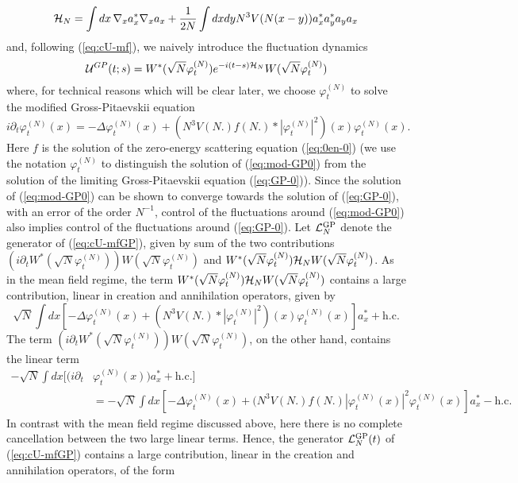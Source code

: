 \documentclass[11pt,a4paper]{article}
\newcommand{\cU}{{\cal U}}
\newcommand{\cH}{{\cal H}}
\newcommand{\cL}{{\cal L}}
\begin{document}
\begin{equation}\label{eq:cHN} \cH_N = \int dx \, \nabla_x a_x^* \nabla_x a_x + \frac{1}{2N} \int dx dy N^3 V(N (x-y)) a_x^* a_y^* a_y a_x \end{equation}
and, following (\ref{eq:cU-mf}), we naively introduce the fluctuation dynamics
\begin{equation}\label{eq:cU-mfGP} 
\cU^{GP} (t;s) = W^* (\sqrt{N} \varphi^{(N)}_t) e^{-i (t-s) \cH_N} W(\sqrt{N} \varphi^{(N)}_t) \end{equation}
where, for technical reasons which will be clear later, we choose $\varphi^{(N)}_t$ to solve the modified Gross-Pitaevskii equation 
\begin{equation}\label{eq:mod-GP0} i\partial_t \varphi^{(N)}_t (x) = -\Delta
\varphi^{(N)}_t (x) + (N^3 V(N.) f(N.) * |\varphi^{(N)}_t|^2) (x)
\varphi^{(N)}_t (x). \end{equation}
Here $f$ is the solution of the zero-energy scattering equation (\ref{eq:0en-0}) (we use the notation $\varphi_t^{(N)}$ to distinguish the solution of (\ref{eq:mod-GP0}) from the solution of the limiting Gross-Pitaevskii equation (\ref{eq:GP-0})). Since the solution of (\ref{eq:mod-GP0}) can be shown to converge towards the solution of (\ref{eq:GP-0}), with an error of the order $N^{-1}$, control of the fluctuations around (\ref{eq:mod-GP0}) also implies control of the fluctuations around (\ref{eq:GP-0}). Let $\cL_N^{\text{GP}}$ denote the generator of (\ref{eq:cU-mfGP}), given by sum of the two contributions $(i\partial_t W^* (\sqrt{N} \varphi^{(N)}_t)) W (\sqrt{N} \varphi^{(N)}_t)$ and $W^* (\sqrt{N} \varphi^{(N)}_t) \cH_N W (\sqrt{N} \varphi^{(N)}_t)$. As in the mean field regime, the term $W^*(\sqrt{N} \varphi^{(N)}_t) \cH_N W(\sqrt{N} \varphi^{(N)}_t)$ contains a large contribution, linear in creation and annihilation operators, given by
\[ \sqrt{N} \int dx \left[ -\Delta \varphi^{(N)}_t (x) + (N^3 V (N.) * |\varphi^{(N)}_t|^2) (x) \varphi^{(N)}_t (x) \right] a_x^* + \text{h.c.} \] 
The term $(i\partial_t W^* (\sqrt{N} \varphi^{(N)}_t)) W (\sqrt{N} \varphi^{(N)}_t)$, on the other hand, contains the linear term
\[ \begin{split} 
- \sqrt{N} \int dx \big[ (i\partial_t &\varphi^{(N)}_t (x)) a_x^* + \text{h.c.}\big]  \\
&=- \sqrt{N} \int dx \left[ -\Delta \varphi^{(N)}_t (x) + (N^3 V(N.) f(N.) |\varphi^{(N)}_t (x)|^2 \varphi^{(N)}_t (x) \right] a_x^* - \text{h.c.}
\end{split}\]
In contrast with the mean field regime discussed above, here there is no complete cancellation between the two large linear terms. Hence, the generator $\cL^{\text{GP}}_N (t)$ of (\ref{eq:cU-mfGP}) contains a large contribution, linear in the creation and annihilation operators, of the form
\end{document}
